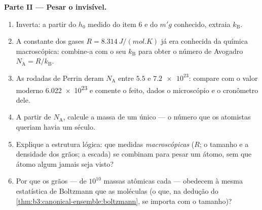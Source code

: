 \begin{problem}
\medskip\noindent\textbf{Parte II --- Pesar o invisível.}
\begin{enumerate}[resume]
  \item Inverta: a partir do $h_0$ medido do item 6 e do $m'g$
        conhecido, extraia $k_{\text{B}}$.
  \item A constante dos gases $R = \qty{8.314}{J/(mol.K)}$ já era
        conhecida da química macroscópica: combine-a com o seu
        $k_{\text{B}}$ para obter o número de Avogadro $N_{\text{A}} =
        R/k_{\text{B}}$.
  \item As rodadas de Perrin deram $N_{\text{A}}$ entre $5.5$ e
        $\num{7.2e23}$: compare com o valor moderno
        \num{6.022e23} e comente o feito, dados o microscópio e o
        cronômetro dele.
  \item A partir de $N_{\text{A}}$, calcule a massa de um único  --- o número que os atomistas queriam havia um
        século.
  \item Explique a estrutura lógica: que medidas \emph{macroscópicas}
        ($R$; o tamanho e a densidade dos grãos; a escada) se combinam
        para pesar um átomo, sem que átomo algum jamais seja visto?
  \item Por que os grãos --- de $10^{10}$ massas atômicas cada ---
        obedecem à mesma estatística de Boltzmann que as moléculas (o
        que, na dedução do
        \cref{thm:b3:canonical-ensemble:boltzmann}, se importa com o
        tamanho)?
\end{enumerate}


\end{problem}
